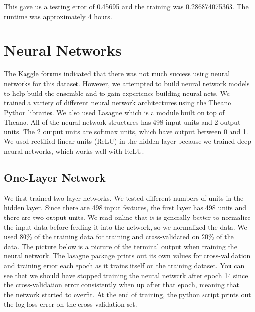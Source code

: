 \documentclass[twoside,11pt]{article}
\theoremstyle{definition}
\begin{document}
      This gave us a testing error of 0.45695 and the training was 0.286874075363. The runtime was approximately 4 hours.

\section{Neural Networks}
The Kaggle forums indicated that there was not much success using neural networks for this dataset. However, we attempted to build neural network models to help build the ensemble and to gain experience building neural nets. We trained a variety of different neural network architectures using the Theano Python libraries. We also used Lasagne which is a module built on top of Theano. All of the neural network structures has 498 input units and 2 output units. The 2 output units are softmax units, which have output between 0 and 1. We used rectified linear units (ReLU) in the hidden layer because we trained deep neural networks, which works well with ReLU. \cite{ReLU}

\subsection{One-Layer Network}
We first trained two-layer networks. We tested different numbers of units in the hidden layer. Since there are 498 input features, the first layer has 498 units and there are two output units. We read online that it is generally better to normalize the input data before feeding it into the network, so we normalized the data. We used 80\% of the training data for training and cross-validated on 20\% of the data. The picture below is a picture of the terminal output when training the neural network. The lasagne package prints out its own values for cross-validation and training error each epoch as it trains itself on the training dataset. You can see that we should have stopped training the neural network after epoch 14 since the cross-validation error consistently when up after that epoch, meaning that the network started to overfit. At the end of training, the python script prints out the log-loss error on the cross-validation set. 
\end{document}
